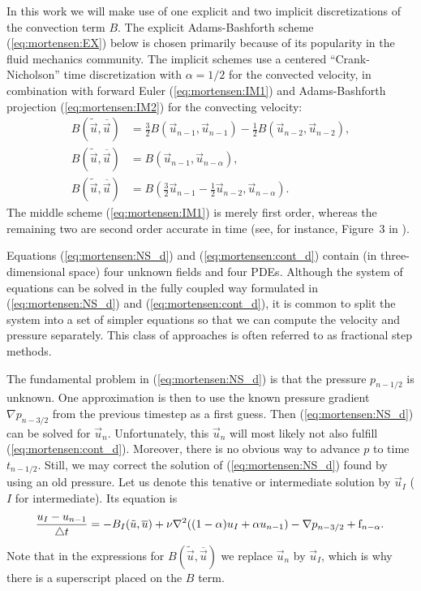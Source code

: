 In this work we will make use of one explicit and two
implicit discretizations of the convection term $B$. 
The explicit  Adams-Bashforth scheme
(\eqref{eq:mortensen:EX}) below is chosen primarily because of its
popularity in the fluid mechanics community. The implicit schemes use
a centered ``Crank-Nicholson'' time discretization with $\alpha=1/2$
for the convected velocity,
in combination with
forward
Euler (\eqref{eq:mortensen:IM1}) and Adams-Bashforth projection (\eqref{eq:mortensen:IM2}) for
the convecting velocity:
\begin{align}
\label{eq:mortensen:EX} 
B(\tilde{\vec{u}},\overline{\vec{u}}) &=
\frac{3}{2}B(\vec{u}_{n-1},\vec{u}_{n-1})-
\frac{1}{2}B(\vec{u}_{n-2},\vec{u}_{n-2}), \\
\label{eq:mortensen:IM1} 
B(\tilde{\vec{u}},\overline{\vec{u}}) &=
B(\vec{u}_{n-1},\vec{u}_{n-\alpha}), \\
 \label{eq:mortensen:IM2} 
B(\tilde{\vec{u}},\overline{\vec{u}}) &=
B(\frac{3}{2}\vec{u}_{n-1}-\frac{1}{2}\vec{u}_{n-2},\vec{u}_{n-\alpha}).
\end{align}
The middle scheme (\eqref{eq:mortensen:IM1}) is merely first order, 
whereas the remaining two are second order accurate in time 
(see, for instance, Figure~3 in \cite{SimoArmero1994}).

Equations (\eqref{eq:mortensen:NS_d}) and (\eqref{eq:mortensen:cont_d}) contain (in
three-dimensional space) four unknown fields and four PDEs.
Although the system of equations can be solved in the fully coupled
way formulated in  (\eqref{eq:mortensen:NS_d}) and (\eqref{eq:mortensen:cont_d}),
it is common to split the system into a set of simpler equations
so that we can compute the velocity and pressure separately.
This class of approaches is often referred to as fractional step
methods.

The fundamental problem in (\eqref{eq:mortensen:NS_d}) is that the pressure
$p_{n-1/2}$ is unknown. One approximation is then to use the
known pressure gradient $\nabla p_{n-3/2}$ from the previous timestep as a first guess. Then (\eqref{eq:mortensen:NS_d}) can
be solved for $\vec{u}_n$. Unfortunately, this $\vec{u}_n$ will most 
likely not also fulfill
(\eqref{eq:mortensen:cont_d}). Moreover, there is no obvious way to advance $p$
to time $t_{n-1/2}$. Still, we may correct the solution of (\eqref{eq:mortensen:NS_d})
found by using an old pressure. Let us denote this tenative or
intermediate solution
by $\vec{u}_I$ ($I$ for intermediate). Its equation is
\begin{equation} 
\label{eq:mortensen:NS_FS} 
\frac{{\vec{u}}_{I}-\vec{u}_{n-1}}{\triangle t} = 
- B_I(\tilde{\vec{u}},\overline{\vec{u}}) + 
\nu \nabla^2 ((1-\alpha) {\vec{u}}_{I} + \alpha \vec{u}_{n-1}) 
-\nabla p_{n-3/2} + \text{f}_{n-\alpha} . \thinspace
\end{equation}
Note that in the expressions for $B(\tilde{\vec{u}},\overline{\vec{u}})$
we replace $\vec{u}_n$ by $\vec{u}_I$, which is why there is
a superscript placed on the $B$ term.

